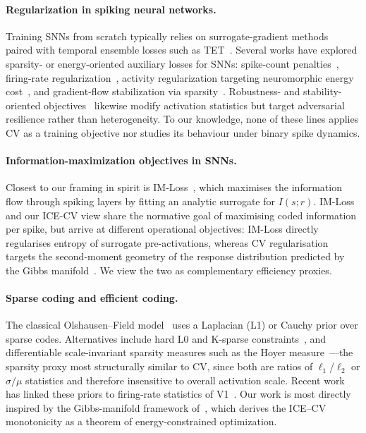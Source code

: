 \documentclass{article}
\begin{document}
\paragraph{Regularization in spiking neural networks.} Training SNNs from scratch typically relies on surrogate-gradient methods~\cite{neftci2019surrogate,cramer2022surrogate} paired with temporal ensemble losses such as TET~\cite{deng2022tet}. Several works have explored sparsity- or energy-oriented auxiliary losses for SNNs: spike-count penalties~\cite{pellegrini2021low}, firing-rate regularization~\cite{kim2022exploring}, activity regularization targeting neuromorphic energy cost~\cite{narduzzi2022optimizing}, and gradient-flow stabilization via sparsity~\cite{yan2022backprop}. Robustness- and stability-oriented objectives~\cite{ding2024robust} likewise modify activation statistics but target adversarial resilience rather than heterogeneity. To our knowledge, none of these lines applies CV as a training objective nor studies its behaviour under binary spike dynamics.

\paragraph{Information-maximization objectives in SNNs.} Closest to our framing in spirit is IM-Loss~\cite{guo2022imloss}, which maximises the information flow through spiking layers by fitting an analytic surrogate for $I(s;r)$. IM-Loss and our ICE-CV view share the normative goal of maximising coded information per spike, but arrive at different operational objectives: IM-Loss directly regularises entropy of surrogate pre-activations, whereas CV regularisation targets the second-moment geometry of the response distribution predicted by the Gibbs manifold~\cite{huang2025variability}. We view the two as complementary efficiency proxies.

\paragraph{Sparse coding and efficient coding.} The classical Olshausen--Field model~\cite{olshausen1996sparse} uses a Laplacian (L1) or Cauchy prior over sparse codes. Alternatives include hard L0 and K-sparse constraints~\cite{makhzani2014}, and differentiable scale-invariant sparsity measures such as the Hoyer measure~\cite{yang2020deephoyer}---the sparsity proxy most structurally similar to CV, since both are ratios of $\ell_1$/$\ell_2$ or $\sigma/\mu$ statistics and therefore insensitive to overall activation scale. Recent work has linked these priors to firing-rate statistics of V1~\cite{zylberberg2011sparse}. Our work is most directly inspired by the Gibbs-manifold framework of~\cite{huang2025variability}, which derives the ICE--CV monotonicity as a theorem of energy-constrained optimization.
\end{document}
